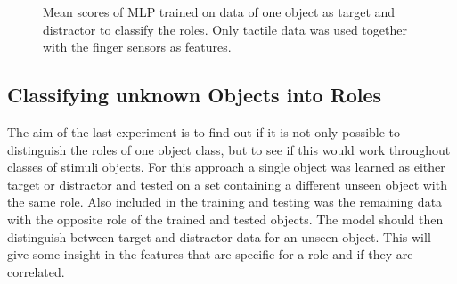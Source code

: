 
\begin{figure}[H]
	\caption{Mean scores of MLP trained on data of one object as target and distractor to classify the roles. Only tactile data was used together with the finger sensors as features.}
	\label{tnt}
\end{figure}

\subsection{Classifying unknown Objects into Roles}
The aim of the last experiment is to find out if it is not only possible to distinguish the roles of one object class, but to see if this would work throughout classes of stimuli objects. For this approach a single object was learned as either target or distractor and tested on a set containing a different unseen object with the same role. Also included in the training and testing was the remaining data with the opposite role of the trained and tested objects. The model should then distinguish between target and distractor data for an unseen object. This will give some insight in the features that are specific for a role and if they are correlated. 

